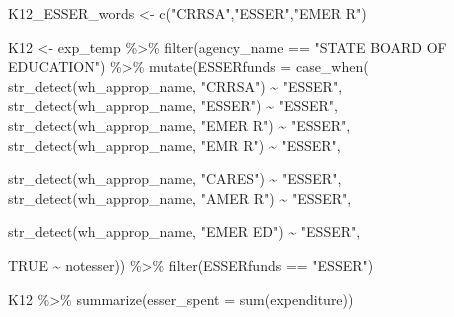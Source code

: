 \documentclass[
  letterpaper,
  DIV=11,
  numbers=noendperiod]{scrreport}
\newenvironment{Shaded}{\begin{snugshade}}{\end{snugshade}}
\newcommand{\AttributeTok}[1]{\textcolor[rgb]{0.40,0.45,0.13}{#1}}
\newcommand{\ConstantTok}[1]{\textcolor[rgb]{0.56,0.35,0.01}{#1}}
\newcommand{\FunctionTok}[1]{\textcolor[rgb]{0.28,0.35,0.67}{#1}}
\newcommand{\NormalTok}[1]{\textcolor[rgb]{0.00,0.23,0.31}{#1}}
\newcommand{\OtherTok}[1]{\textcolor[rgb]{0.00,0.23,0.31}{#1}}
\newcommand{\SpecialCharTok}[1]{\textcolor[rgb]{0.37,0.37,0.37}{#1}}
\newcommand{\StringTok}[1]{\textcolor[rgb]{0.13,0.47,0.30}{#1}}
\begin{document}
\begin{Shaded}
\begin{Highlighting}[]
\NormalTok{K12\_ESSER\_words }\OtherTok{\textless{}{-}} \FunctionTok{c}\NormalTok{(}\StringTok{"CRRSA"}\NormalTok{,}\StringTok{"ESSER"}\NormalTok{,}\StringTok{"EMER R"}\NormalTok{)}

\NormalTok{K12 }\OtherTok{\textless{}{-}}\NormalTok{ exp\_temp }\SpecialCharTok{\%\textgreater{}\%} 
  \FunctionTok{filter}\NormalTok{(agency\_name }\SpecialCharTok{==} \StringTok{"STATE BOARD OF EDUCATION"}\NormalTok{) }\SpecialCharTok{\%\textgreater{}\%}
  \FunctionTok{mutate}\NormalTok{(}\AttributeTok{ESSERfunds =} \FunctionTok{case\_when}\NormalTok{(}
    \FunctionTok{str\_detect}\NormalTok{(wh\_approp\_name, }\StringTok{"CRRSA"}\NormalTok{) }\SpecialCharTok{\textasciitilde{}} \StringTok{"ESSER"}\NormalTok{,}
    \FunctionTok{str\_detect}\NormalTok{(wh\_approp\_name, }\StringTok{"ESSER"}\NormalTok{) }\SpecialCharTok{\textasciitilde{}} \StringTok{"ESSER"}\NormalTok{,}
    \FunctionTok{str\_detect}\NormalTok{(wh\_approp\_name, }\StringTok{"EMER R"}\NormalTok{) }\SpecialCharTok{\textasciitilde{}} \StringTok{"ESSER"}\NormalTok{,}
        \FunctionTok{str\_detect}\NormalTok{(wh\_approp\_name, }\StringTok{"EMR R"}\NormalTok{) }\SpecialCharTok{\textasciitilde{}} \StringTok{"ESSER"}\NormalTok{,}

        \FunctionTok{str\_detect}\NormalTok{(wh\_approp\_name, }\StringTok{"CARES"}\NormalTok{) }\SpecialCharTok{\textasciitilde{}} \StringTok{"ESSER"}\NormalTok{,}
            \FunctionTok{str\_detect}\NormalTok{(wh\_approp\_name, }\StringTok{"AMER R"}\NormalTok{) }\SpecialCharTok{\textasciitilde{}} \StringTok{"ESSER"}\NormalTok{,}

        \FunctionTok{str\_detect}\NormalTok{(wh\_approp\_name, }\StringTok{"EMER ED"}\NormalTok{) }\SpecialCharTok{\textasciitilde{}} \StringTok{"ESSER"}\NormalTok{,}

                                 \ConstantTok{TRUE} \SpecialCharTok{\textasciitilde{}} \StringTok{\textquotesingle{}notesser\textquotesingle{}}\NormalTok{)) }\SpecialCharTok{\%\textgreater{}\%}
  \FunctionTok{filter}\NormalTok{(ESSERfunds }\SpecialCharTok{==} \StringTok{"ESSER"}\NormalTok{)}

\NormalTok{K12 }\SpecialCharTok{\%\textgreater{}\%} \FunctionTok{summarize}\NormalTok{(}\AttributeTok{esser\_spent =} \FunctionTok{sum}\NormalTok{(expenditure))}
\end{Highlighting}
\end{Shaded}
\end{document}
